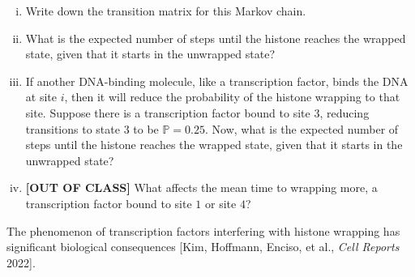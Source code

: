 \documentclass[12pt,letterpaper]{article}
\begin{document}
\begin{enumerate}
\begin{enumerate}[i.]
  \item Write down the transition matrix for this Markov chain.
  \item What is the expected number of steps until the histone reaches the wrapped state, given that it starts in the unwrapped state?
  \item If another DNA-binding molecule, like a transcription factor, binds the DNA at site $i$, then it will reduce the probability of the histone wrapping to that site. 
  Suppose there is a transcription factor bound to site $3$, reducing transitions to state $3$ to be $\mathbb{P}=0.25$. 
  Now, what is the expected number of steps until the histone reaches the wrapped state, given that it starts in the unwrapped state?
  \item \textbf{[OUT OF CLASS]} What affects the mean time to wrapping more, a transcription factor bound to site $1$ or site $4$?
\end{enumerate}

The phenomenon of transcription factors interfering with histone wrapping has significant biological consequences [Kim, Hoffmann, Enciso, et al., \textit{Cell Reports} 2022].

\end{enumerate} %
\end{document}
